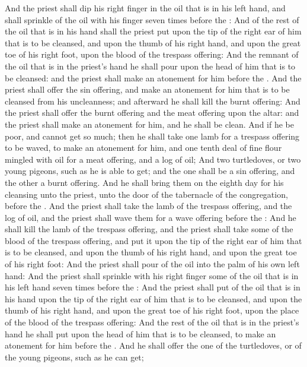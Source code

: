 \begin{biblechapter}
\verse And the priest shall dip his right finger in the oil that is in his left hand, and shall sprinkle of the oil with his finger seven times before the \LORD:
\verse And of the rest of the oil that is in his hand shall the priest put upon the tip of the right ear of him that is to be cleansed, and upon the thumb of his right hand, and upon the great toe of his right foot, upon the blood of the trespass offering:
\verse And the remnant of the oil that is in the priest's hand he shall pour upon the head of him that is to be cleansed: and the priest shall make an atonement for him before the \LORD.
\verse And the priest shall offer the sin offering, and make an atonement for him that is to be cleansed from his uncleanness; and afterward he shall kill the burnt offering:
\verse And the priest shall offer the burnt offering and the meat offering upon the altar: and the priest shall make an atonement for him, and he shall be clean.
\verse And if he be poor, and cannot get so much; then he shall take one lamb for a trespass offering to be waved, to make an atonement for him, and one tenth deal of fine flour mingled with oil for a meat offering, and a log of oil;
\verse And two turtledoves, or two young pigeons, such as he is able to get; and the one shall be a sin offering, and the other a burnt offering.
\verse And he shall bring them on the eighth day for his cleansing unto the priest, unto the door of the tabernacle of the congregation, before the \LORD.
\verse And the priest shall take the lamb of the trespass offering, and the log of oil, and the priest shall wave them for a wave offering before the \LORD:
\verse And he shall kill the lamb of the trespass offering, and the priest shall take some of the blood of the trespass offering, and put it upon the tip of the right ear of him that is to be cleansed, and upon the thumb of his right hand, and upon the great toe of his right foot:
\verse And the priest shall pour of the oil into the palm of his own left hand:
\verse And the priest shall sprinkle with his right finger some of the oil that is in his left hand seven times before the \LORD:
\verse And the priest shall put of the oil that is in his hand upon the tip of the right ear of him that is to be cleansed, and upon the thumb of his right hand, and upon the great toe of his right foot, upon the place of the blood of the trespass offering:
\verse And the rest of the oil that is in the priest's hand he shall put upon the head of him that is to be cleansed, to make an atonement for him before the \LORD.
\verse And he shall offer the one of the turtledoves, or of the young pigeons, such as he can get;

\end{biblechapter}
